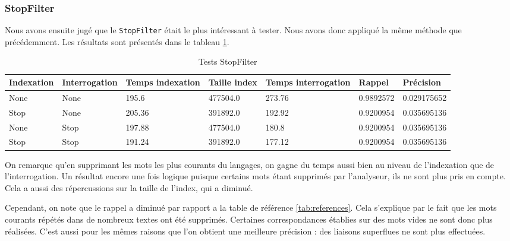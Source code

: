 \subsubsection{StopFilter}

Nous avons ensuite jugé que le \texttt{StopFilter} était le plus intéressant à tester. Nous avons donc appliqué la même méthode que précédemment. Les résultats sont présentés dans le tableau \ref{tab:tests_StopFilter}.

\begin{table}[!htbp]
    \hspace{-2cm}
                \begin{tabular}{|p{2.5cm}|p{2.5cm}|p{2cm}|p{2cm}|p{2.5cm}|p{2cm}|p{2cm}|}
                    \hline
                    \textbf{Indexation} & \textbf{Interrogation} & \textbf{Temps \mbox{indexation}} & \textbf{Taille \mbox{index}} & \textbf{Temps \mbox{interrogation}} & \textbf{Rappel} & \textbf{Précision}\\
                    \hline
                    None & None & 195.6 & 477504.0 & 273.76 & 0.9892572 & 0.029175652\\
                    \hline
Stop & None & 205.36 & 391892.0 & 192.92 & 0.9200954 & 0.035695136\\
		\hline
None & Stop & 197.88 & 477504.0 & 180.8 & 0.9200954 & 0.035695136\\
		\hline
Stop & Stop & 191.24 & 391892.0 & 177.12 & 0.9200954 & 0.035695136\\
                    \hline
                \end{tabular}
                \caption{Tests StopFilter}
                \label{tab:tests_StopFilter}
            \end{table}

On remarque qu’en supprimant les mots les plus courants du langages, on gagne du temps aussi bien au niveau de l’indexation que de l’interrogation. Un résultat encore une fois logique puisque certains mots étant supprimés par l'analyseur, ils ne sont plus pris en compte. Cela a aussi des répercussions sur la taille de l’index, qui a diminué.
	
Cependant, on note que le rappel a diminué par rapport a la table de référence \ref{tab:references}. Cela s’explique par le fait que les mots courants répétés dans de nombreux textes ont été supprimés. Certaines correspondances établies sur des mots vides ne sont donc plus réalisées. C’est aussi pour les mêmes raisons que l’on obtient une meilleure précision : des liaisons superflues ne sont plus effectuées.

